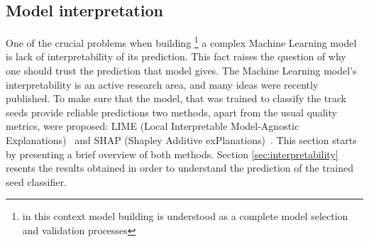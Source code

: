 \subsection{Model interpretation}

One of the crucial problems when building \footnote{in this context model building is understood as a complete model selection and validation processes} a complex Machine Learning model is lack of interpretability of its prediction. This fact raises the question of why one should trust the prediction that model gives. The Machine Learning model's interpretability is an active research area, and many ideas were recently published. To make sure that the model, that was trained to classify the track seeds provide reliable predictions two methods, apart from the usual quality metrics,
were proposed: LIME (Local Interpretable Model-Agnostic Explanations)~\cite{lime} and SHAP (Shapley Additive exPlanations)~\cite{shap}. This section starts by presenting a brief overview of both methods. Section \ref{sec:interpretability} resents the results obtained in order to understand the prediction of the trained seed classifier.
